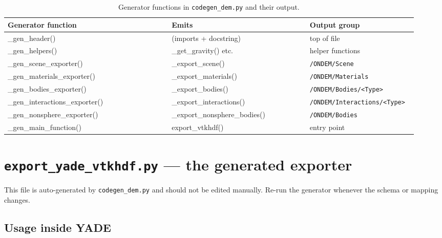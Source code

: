 \documentclass[11pt,a4paper]{article}
\begin{document}
\begin{table}[htbp]
\centering
\begin{tabularx}{\textwidth}{>{\ttfamily\small\raggedright\arraybackslash}p{0.38\linewidth}>{\ttfamily\small\raggedright\arraybackslash}p{0.32\linewidth}>{\small\raggedright\arraybackslash}p{0.23\linewidth}}
\toprule
\sffamily\textbf{Generator function} & \sffamily\textbf{Emits} & \sffamily\textbf{Output group} \\
\midrule
\_gen\_header()                 & (imports + docstring)              & top of file \\
\_gen\_helpers()                & \_get\_gravity() etc.              & helper functions \\
\_gen\_scene\_exporter()        & \_export\_scene()                  & \texttt{/ONDEM/Scene} \\
\_gen\_materials\_exporter()    & \_export\_materials()              & \texttt{/ONDEM/Materials} \\
\_gen\_bodies\_exporter()       & \_export\_bodies()                 & \texttt{/ONDEM/Bodies/<Type>} \\
\_gen\_interactions\_exporter() & \_export\_interactions()           & \texttt{/ONDEM/Interactions/<Type>} \\
\_gen\_nonsphere\_exporter()    & \_export\_nonsphere\_bodies()      & \texttt{/ONDEM/Bodies} \\
\_gen\_main\_function()         & export\_vtkhdf()                   & entry point \\
\bottomrule
\end{tabularx}
\caption{Generator functions in \texttt{codegen\_dem.py} and their output.}
\end{table}

\section{\texttt{export\_yade\_vtkhdf.py} --- the generated exporter}
\label{sec:exporter}

This file is auto-generated by \texttt{codegen\_dem.py} and should not be
edited manually. Re-run the generator whenever the schema or mapping changes.

\subsection{Usage inside YADE}
\end{document}
